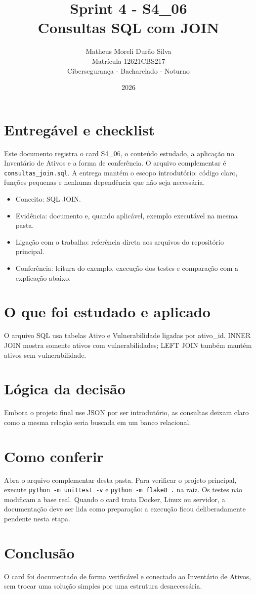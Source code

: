 \documentclass[12pt]{article}
\title{Sprint 4 - S4\_06\\Consultas SQL com JOIN}
\author{Matheus Moreli Durão Silva\\ Matrícula 12621CBS217\\ Cibersegurança - Bacharelado - Noturno}
\date{2026}
\begin{document}
\maketitle

\section*{Entregável e checklist}
Este documento registra o card S4\_06, o conteúdo estudado, a aplicação no Inventário de Ativos e a forma de conferência. O arquivo complementar é \texttt{consultas\_join.sql}. A entrega mantém o escopo introdutório: código claro, funções pequenas e nenhuma dependência que não seja necessária.

\begin{itemize}
\item Conceito: SQL JOIN.
\item Evidência: documento e, quando aplicável, exemplo executável na mesma pasta.
\item Ligação com o trabalho: referência direta aos arquivos do repositório principal.
\item Conferência: leitura do exemplo, execução dos testes e comparação com a explicação abaixo.
\end{itemize}

\section*{O que foi estudado e aplicado}
O arquivo SQL usa tabelas Ativo e Vulnerabilidade ligadas por ativo\_id. INNER JOIN mostra somente ativos com vulnerabilidades; LEFT JOIN também mantém ativos sem vulnerabilidade.

\section*{Lógica da decisão}
Embora o projeto final use JSON por ser introdutório, as consultas deixam claro como a mesma relação seria buscada em um banco relacional.

\section*{Como conferir}
Abra o arquivo complementar desta pasta. Para verificar o projeto principal, execute \texttt{python -m unittest -v} e \texttt{python -m flake8 .} na raiz. Os testes não modificam a base real. Quando o card trata Docker, Linux ou servidor, a documentação deve ser lida como preparação: a execução ficou deliberadamente pendente nesta etapa.

\section*{Conclusão}
O card foi documentado de forma verificável e conectado ao Inventário de Ativos, sem trocar uma solução simples por uma estrutura desnecessária.
\end{document}
